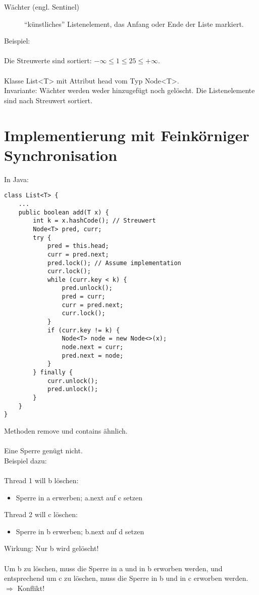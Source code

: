 \begin{description}
	\item[Wächter (engl. Sentinel)] "`künstliches"' Listenelement, das Anfang oder Ende der Liste markiert.
\end{description}

Beispiel:\\ %
\\
Die Streuwerte sind sortiert: $ -\infty \leq 1 \leq 25 \leq +\infty $.\\
\\
Klasse List<T> mit Attribut head vom Typ Node<T>.\\
Invariante: Wächter werden weder hinzugefügt noch gelöscht. Die Listenelemente sind nach Streuwert sortiert.

\section{Implementierung mit Feinkörniger Synchronisation}
In Java:
\lstset{language=Java,tabsize=4}
\begin{lstlisting}
class List<T> {
	...
	public boolean add(T x) {
		int k = x.hashCode(); // Streuwert
		Node<T> pred, curr;
		try {
			pred = this.head;
			curr = pred.next;
			pred.lock(); // Assume implementation
			curr.lock();
			while (curr.key < k) {
				pred.unlock();
				pred = curr;
				curr = pred.next;
				curr.lock();
			}
			if (curr.key != k) {
				Node<T> node = new Node<>(x);
				node.next = curr;
				pred.next = node;
			}
		} finally {
			curr.unlock();
			pred.unlock();
		}
	}
}
\end{lstlisting}

Methoden remove und contains ähnlich.\\
\\
Eine Sperre genügt nicht.\\
Beispiel dazu:\\%
\\
Thread 1 will b löschen:
\begin{itemize}
	\item Sperre in a erwerben; a.next auf c setzen
\end{itemize}
Thread 2 will c löschen:
\begin{itemize}
	\item Sperre in b erwerben; b.next auf d setzen
\end{itemize}
Wirkung: Nur b wird gelöscht!\\
\\
Um b zu löschen, muss die Sperre in a und in b erworben werden, und entsprechend um c zu löschen, muss die Sperre in b und in c erworben werden. $\Rightarrow$ Konflikt!


